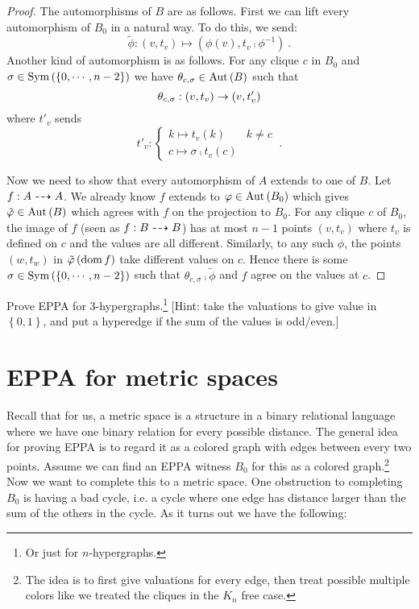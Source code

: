 \documentclass{amsart}
\begin{document}
\begin{proof}
The automorphisms of $B$ are as follows. First we can lift every automorphism of $B_0$ in
a natural way. To do this, we send:
\begin{equation}
\tilde \phi: \left( v , t_v \right)\mapsto \left( \phi\left( v \right) , t_v\comp
\phi^{-1} \right) \ .
\end{equation}
Another kind of automorphism is as follows. 
For any clique $c$ in $B_0$ and $\sigma\in \operatorname{Sym}\left( \left\{ 0 , \cdots , n-2 \right\}
\right)$
we have $\theta_{c,\sigma}\in \operatorname{Aut}\left( B \right)$ such that
\begin{equation}
\theta_{c,\sigma} : \left( v , t_v \right)\rightarrow \left( v , t'_v \right)
\end{equation}
where $t'_v$ sends 
\begin{equation}
t'_v : 
\begin{cases}
k\mapsto t_v\left( k \right) & k\neq c\\
c\mapsto \sigma\comp t_v\left( c \right)
\end{cases} \ .
\end{equation}

Now we need to show that every automorphism of $A$ extends to one of $B$.
Let $f:A\dashrightarrow A$. We already know $f$ extends to $\varphi \in \operatorname{Aut}\left( B_0 \right)$ which
gives $\tilde {\varphi} \in \operatorname{Aut}\left( B \right)$ which agrees with $f$ on the projection to
$B_0$. 
For any clique $c$ of $B_0$, the image of $f$ (seen as $f:B\dashrightarrow B$)
has at most $n-1$ points $\left( v , t_v \right)$ where $t_v$ is defined on $c$ and the
values are all different. 
Similarly, to any such $\phi$, the points $\left( w , t_w \right)$ in $\tilde {\varphi}\left(
\operatorname{dom} f \right)$ take different values on $c$.
Hence there is some $\sigma\in \operatorname{Sym}\left( \left\{ 0 ,  \cdots , n-2 \right\} \right)$ such
that $\theta_{c , \sigma} \comp \tilde \phi$ and $f$ agree on the values at $c$.
\end{proof}

\begin{exr}
Prove EPPA for $3$-hypergraphs.\footnote{Or just for $n$-hypergraphs.}
[Hint: take the valuations to give value in $\left\{ 0,1 \right\}$, and put a hyperedge 
if the sum of the values is odd/even.]
\end{exr}


\section{EPPA for metric spaces}

Recall that for us, a metric space is a structure in a binary relational language
where we have one binary relation for every possible distance.
The general idea for proving EPPA is to regard it as a colored graph with edges between
every two points.
Assume we can find an EPPA witness $B_0$ for this as a colored graph.\footnote{The idea is to
first give valuations for every edge, then treat possible multiple colors like we treated
the cliques in the $K_n$ free case.}
Now we want to complete this to a metric space. 
One obstruction to completing $B_0$ is having a bad cycle, i.e. a cycle where
one edge has distance larger than the sum of the others in the cycle. 
As it turns out we have the following:
\end{document}

